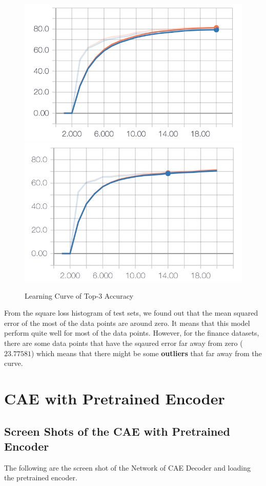 \documentclass{article}
\begin{document}
\begin{figure}[h]
  \centering
  \includegraphics[scale=0.7]{top_3_acc_sc.png}
  \includegraphics[scale=0.7]{top_3_acc_pre.png}
  \caption{Learning Curve of Top-3 Accuracy}
\end{figure}

From the square loss histogram of test sets, we found out that the mean squared error of the most of the data points are around zero. It means that this model perform quite well for most of the data points. However, for the finance datasets, there are some data points that have the sqaured error far away from zero ($23.77581$) which means that there might be some \textbf{outliers} that far away from the curve.

\section{CAE with Pretrained Encoder}

\subsection{Screen Shots of the CAE with Pretrained Encoder}
The following are the screen shot of the Network of CAE Decoder and loading the pretrained encoder.
\end{document}
